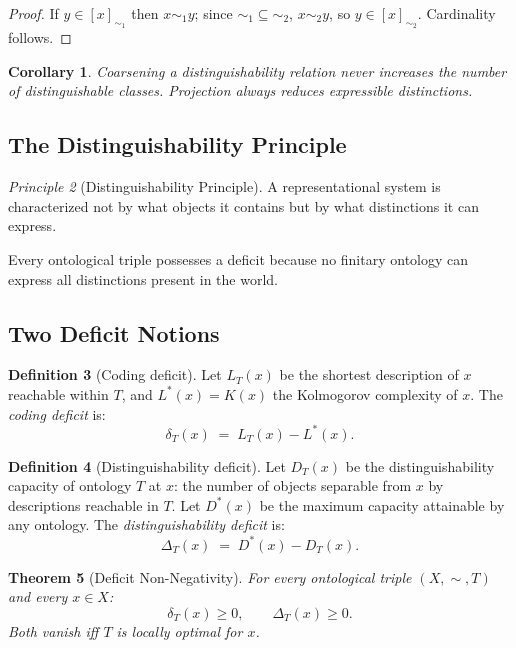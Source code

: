 \documentclass[12pt, a4paper]{article}
\theoremstyle{plain}
\newtheorem{theorem}{Theorem}[section]
\newtheorem{corollary}[theorem]{Corollary}
\theoremstyle{definition}
\newtheorem{definition}[theorem]{Definition}
\theoremstyle{remark}
\newtheorem{principle}[theorem]{Principle}
\newcommand{\Lreach}{L_T}
\newcommand{\Lopt}{L^*}
\begin{document}
\begin{proof}
If $y\in[x]_{\sim_1}$ then $x\sim_1 y$; since $\sim_1\subseteq\sim_2$,
$x\sim_2 y$, so $y\in[x]_{\sim_2}$. Cardinality follows.
\end{proof}

\begin{corollary}
Coarsening a distinguishability relation never increases the number of
distinguishable classes. Projection always reduces expressible distinctions.
\end{corollary}

\subsection{The Distinguishability Principle}

\begin{principle}[Distinguishability Principle]
\label{prin:dist}
A representational system is characterized not by what objects it contains
but by what distinctions it can express.
\end{principle}

Every ontological triple possesses a deficit because no finitary ontology
can express all distinctions present in the world.

\subsection{Two Deficit Notions}
\label{subsec:deficits}

\begin{definition}[Coding deficit]
\label{def:coding-deficit}
Let $\Lreach(x)$ be the shortest description of $x$ reachable within $T$,
and $\Lopt(x)=K(x)$ the Kolmogorov complexity of $x$. The \emph{coding
deficit} is:
\[
  \delta_T(x) \;=\; \Lreach(x) - \Lopt(x).
\]
\end{definition}

\begin{definition}[Distinguishability deficit]
\label{def:dist-deficit}
Let $D_T(x)$ be the distinguishability capacity of ontology $T$ at $x$:
the number of objects separable from $x$ by descriptions reachable in $T$.
Let $D^*(x)$ be the maximum capacity attainable by any ontology. The
\emph{distinguishability deficit} is:
\[
  \Delta_T(x) \;=\; D^*(x) - D_T(x).
\]
\end{definition}

\begin{theorem}[Deficit Non-Negativity]
\label{thm:nonneg}
For every ontological triple $(X,\sim,T)$ and every $x\in X$:
\[
  \delta_T(x)\ge 0,\qquad \Delta_T(x)\ge 0.
\]
Both vanish iff $T$ is locally optimal for $x$.
\end{theorem}
\end{document}
